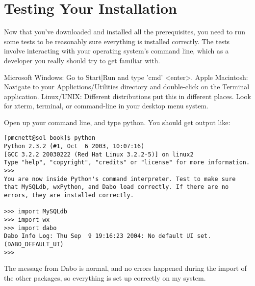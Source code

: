 \section{Testing Your Installation}

Now that you've downloaded and installed all the prerequisites, you need to run some tests to be reasonably sure everything is installed correctly. The tests involve interacting with your operating system's command line, which as a developer you really should try to get familiar with.

Microsoft Windows: Go to Start|Run and type 'cmd' <enter>.
Apple Macintosh: Navigate to your Applictions/Utilities directory and double-click on the Terminal application.
Linux/UNIX: Different distributions put this in different places. Look for xterm, terminal, or command-line in your desktop menu system.
	
Open up your command line, and type python. You should get output like:	%
\begin{verbatim}
[pmcnett@sol book]$ python
Python 2.3.2 (#1, Oct  6 2003, 10:07:16)
[GCC 3.2.2 20030222 (Red Hat Linux 3.2.2-5)] on linux2
Type "help", "copyright", "credits" or "license" for more information.
>>>
You are now inside Python's command interpreter. Test to make sure that MySQLdb, wxPython, and Dabo load correctly. If there are no errors, they are installed correctly.

>>> import MySQLdb
>>> import wx
>>> import dabo
Dabo Info Log: Thu Sep  9 19:16:23 2004: No default UI set. (DABO_DEFAULT_UI)
>>>
\end{verbatim}
The message from Dabo is normal, and no errors happened during the import of the other packages, so everything is set up correctly on my system. 